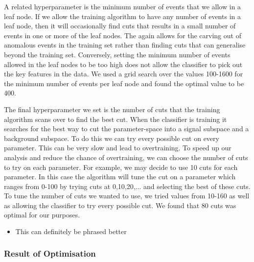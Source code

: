 \documentclass[11pt]{cuthesis}
\begin{document}
A related hyperparameter is the minimum number of events that we allow in a leaf node. If we allow the training algorithm to have any number of events in a leaf node, then it will occasionally find cuts that results in a small number of events in one or more of the leaf nodes. The again allows for the carving out of anomalous events in the training set rather than finding cuts that can generalise beyond the training set. Conversely, setting the minimum number of events allowed in the leaf nodes to be too high does not allow the classifier to pick out the key features in the data. We used a grid search over the values 100-1600 for the minimum number of events per leaf node and found the optimal value to be 400. 

The final hyperparameter we set is the number of cuts that the training algorithm scans over to find the best cut. When the classifier is training it searches for the best way to cut the parameter-space into a signal subspace and a background subspace. To do this we can try every possible cut on every parameter. This can be very slow and lead to overtraining. To speed up our analysis and reduce the chance of overtraining, we can choose the number of cuts to try on each parameter. For example, we may decide to use 10 cuts for each parameter. In this case the algorithm will tune the cut on a parameter which ranges from 0-100 by trying cuts at 0,10,20,... and selecting the best of these cuts. To tune the number of cuts we wanted to use, we tried values from 10-160 as well as allowing the classifier to try every possible cut. We found that 80 cuts was optimal for our purposes. 

\begin{itemize}
\item This can definitely be phrased better
\end{itemize}

\subsubsection{Result of Optimisation}
\end{document}
